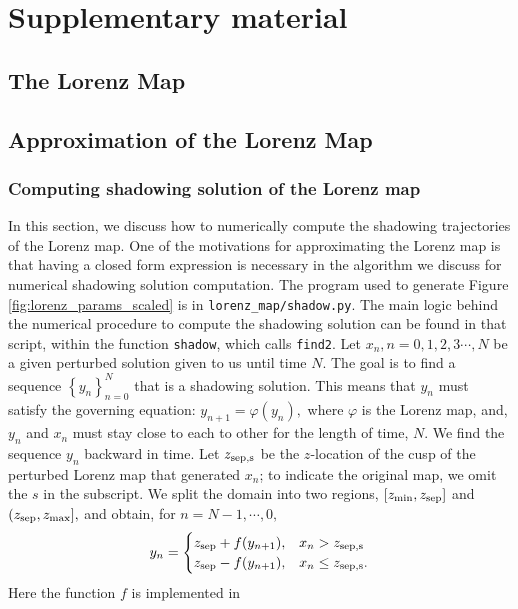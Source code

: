 \section{Supplementary material}
\subsection{The Lorenz Map}
\subsection{Approximation of the Lorenz Map}

\subsubsection{Computing shadowing solution of the Lorenz map}
In this section, we discuss how to numerically compute the shadowing trajectories of the Lorenz map. One of the motivations for approximating the Lorenz map is that having a closed form expression is necessary in the algorithm we discuss for numerical shadowing solution computation. The program used to generate Figure 
\ref{fig:lorenz_params_scaled} is in \verb+lorenz_map/shadow.py+. The main logic behind the numerical procedure to compute the shadowing solution can be found in that script, within the function \verb+shadow+, which calls \verb+find2+. Let $x_n, n = 0,1,2,3\cdots,N$ be a given perturbed solution given to us until time $N$. The goal is to find a sequence $\left\{ y_n\right\}_{n=0}^{N}$ that is a shadowing solution. This means that $y_n$ must satisfy the governing equation: $y_{n+1} = \varphi(y_n),$ where $\varphi$ is the Lorenz map, and, 
$y_n$ and $x_n$ must stay close to each to other for the length of time, $N$. We find the sequence $y_n$ backward in time. Let $z_{\rm sep,s}$ be the $z$-location of the cusp of the perturbed Lorenz map that generated $x_n$; to indicate the original map, we omit the $s$ in the subscript. We split the domain into two regions, $[z_{\rm min}, z_{\rm sep}]$ and $(z_{\rm sep}, z_{\rm max}],$ and 
obtain, for $n = N-1, \cdots, 0,$
\begin{align}
    y_n = \begin{cases}
                     z_{\rm sep} + f(y_{n+1}), & x_n > z_{\rm sep, s} \\
                     z_{\rm sep} - f(y_{n+1}), & x_n \leq z_{\rm sep, s}.
    \end{cases}
    \label{eqn:shadowingFormula}
\end{align}
Here the function $f$ is implemented in 
